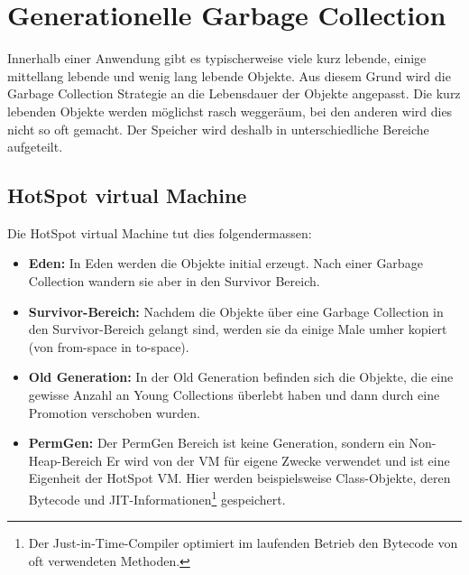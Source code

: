 \section{Generationelle Garbage Collection}\label{generational gc}
Innerhalb einer Anwendung gibt es typischerweise viele kurz lebende, einige mittellang lebende und wenig lang lebende Objekte. Aus diesem Grund wird die Garbage Collection Strategie an die Lebensdauer der Objekte angepasst. Die kurz lebenden Objekte werden möglichst rasch weggeräum, bei den anderen wird dies nicht so oft gemacht. Der Speicher wird deshalb in unterschiedliche Bereiche aufgeteilt. 
\subsection{HotSpot virtual Machine}
Die HotSpot virtual Machine tut dies folgendermassen\cite{langerkreft201003}:

\begin{itemize}
	\item \textbf{Eden:} In Eden werden die Objekte initial erzeugt. Nach einer Garbage Collection wandern sie aber in den Survivor Bereich.
	\item \textbf{Survivor-Bereich:} Nachdem die Objekte über eine Garbage Collection in den Survivor-Bereich gelangt sind, werden sie da einige Male umher kopiert (von from-space in to-space).
	\item \textbf{Old Generation:} In der Old Generation befinden sich die Objekte, die eine gewisse Anzahl an Young Collections überlebt haben und dann durch eine Promotion verschoben wurden.
	\item  \textbf{PermGen:} Der PermGen Bereich ist keine Generation, sondern ein Non-Heap-Bereich Er wird von der VM für eigene Zwecke verwendet und ist eine Eigenheit der HotSpot VM. Hier werden beispielsweise Class-Objekte, deren Bytecode und JIT-Informationen\footnote{Der Just-in-Time-Compiler optimiert im laufenden Betrieb den Bytecode von oft verwendeten Methoden.} gespeichert.
\end{itemize}


